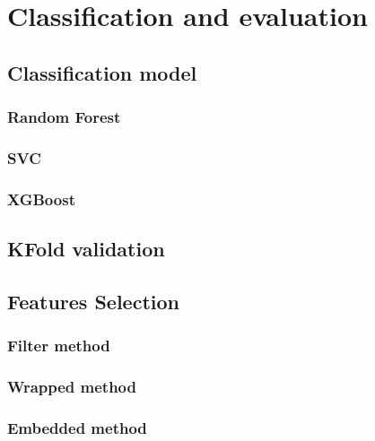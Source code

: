 \chapter{Classification and evaluation}
\section{Classification model}
\subsection{Random Forest}
\subsection{SVC}
\subsection{XGBoost}
\section{KFold validation}
\section{Features Selection}
\subsection{Filter method}
\subsection{Wrapped method}
\subsection{Embedded method}